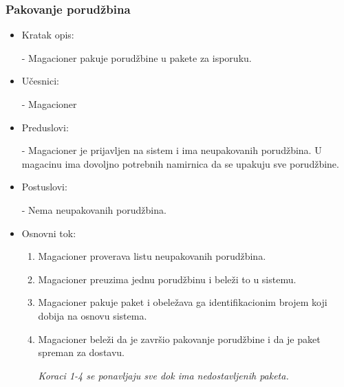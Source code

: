 
\subsubsection{Pakovanje porudžbina}
	\begin{itemize}
		\item{Kratak opis:} 
		
		- Magacioner pakuje porudžbine u pakete za isporuku.
		\item{Učesnici:} 
		
		- Magacioner
		\item{Preduslovi:}
		
		- Magacioner je prijavljen na sistem i ima neupakovanih porudžbina. U magacinu ima dovoljno potrebnih namirnica da se upakuju sve porudžbine.
		\item{Postuslovi:}
		
		- Nema neupakovanih porudžbina.
		\item{Osnovni tok:}
		\begin{enumerate}
			\item{Magacioner proverava listu neupakovanih porudžbina.}
			\item{Magacioner preuzima jednu porudžbinu i beleži to u sistemu.}
			\item{Magacioner pakuje paket i obeležava ga identifikacionim brojem koji dobija na osnovu sistema.}
			\item{Magacioner beleži da je završio pakovanje porudžbine i da je paket spreman za dostavu.}

			\textit{Koraci 1-4 se ponavljaju sve dok ima nedostavljenih paketa.}
		\end{enumerate}

	\end{itemize}
